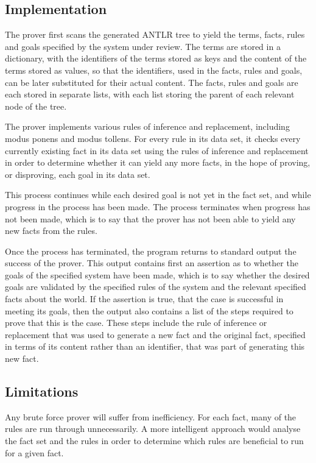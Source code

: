 \documentclass{l4proj}
\begin{document}

\subsection{Implementation}
The prover first scans the generated ANTLR tree to yield the terms, facts, rules and goals specified by the system under review. The terms are stored in a dictionary, with the identifiers of the terms stored as keys and the content of the terms stored as values, so that the identifiers, used in the facts, rules and goals, can be later substituted for their actual content. The facts, rules and goals are each stored in separate lists, with each list storing the parent of each relevant node of the tree. 

The prover implements various rules of inference and replacement, including modus ponens and modus tollens. For every rule in its data set, it checks every currently existing fact in its data set using the rules of inference and replacement in order to determine whether it can yield any more facts, in the hope of proving, or disproving, each goal in its data set. 

This process continues while each desired goal is not yet in the fact set, and while progress in the process has been made. The process terminates when progress has not been made, which is to say that the prover has not been able to yield any new facts from the rules. 

Once the process has terminated, the program returns to standard output the success of the prover. This output contains first an assertion as to whether the goals of the specified system have been made, which is to say whether the desired goals are validated by the specified rules of the system and the relevant specified facts about the world. If the assertion is true, that the case is successful in meeting its goals, then the output also contains a list of the steps required to prove that this is the case. These steps include the rule of inference or replacement that was used to generate a new fact and the original fact, specified in terms of its content rather than an identifier, that was part of generating this new fact. 

\subsection{Limitations}
Any brute force prover will suffer from inefficiency. For each fact, many of the rules are run through unnecessarily. A more intelligent approach would analyse the fact set and the rules in order to determine which rules are beneficial to run for a given fact. 
\end{document}

